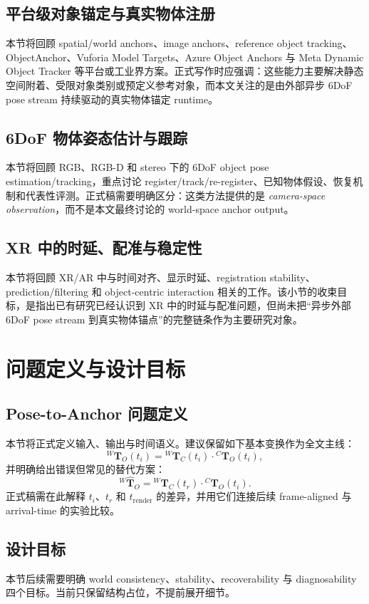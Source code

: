 \documentclass[review]{vgtc}
\begin{document}
\subsection{平台级对象锚定与真实物体注册}
本节将回顾 spatial/world anchors、image anchors、reference object tracking、ObjectAnchor、Vuforia Model Targets、Azure Object Anchors 与 Meta Dynamic Object Tracker 等平台或工业界方案。正式写作时应强调：这些能力主要解决静态空间附着、受限对象类别或预定义参考对象，而本文关注的是由外部异步 6DoF pose stream 持续驱动的真实物体锚定 runtime。

\subsection{6DoF 物体姿态估计与跟踪}
本节将回顾 RGB、RGB-D 和 stereo 下的 6DoF object pose estimation/tracking，重点讨论 register/track/re-register、已知物体假设、恢复机制和代表性评测。正式稿需要明确区分：这类方法提供的是 \textit{camera-space observation}，而不是本文最终讨论的 world-space anchor output。

\subsection{XR 中的时延、配准与稳定性}
本节将回顾 XR/AR 中与时间对齐、显示时延、registration stability、prediction/filtering 和 object-centric interaction 相关的工作。该小节的收束目标，是指出已有研究已经认识到 XR 中的时延与配准问题，但尚未把“异步外部 6DoF pose stream 到真实物体锚点”的完整链条作为主要研究对象。

\section{问题定义与设计目标}

\subsection{Pose-to-Anchor 问题定义}
本节将正式定义输入、输出与时间语义。建议保留如下基本变换作为全文主线：
\[
{}^{W}\mathbf{T}_{O}(t_i) =
{}^{W}\mathbf{T}_{C}(t_i)\cdot{}^{C}\mathbf{T}_{O}(t_i),
\]
并明确给出错误但常见的替代方案：
\[
{}^{W}\hat{\mathbf{T}}_{O} =
{}^{W}\mathbf{T}_{C}(t_r)\cdot{}^{C}\mathbf{T}_{O}(t_i).
\]
正式稿需在此解释 \(t_i\)、\(t_r\) 和 \(t_{\text{render}}\) 的差异，并用它们连接后续 frame-aligned 与 arrival-time 的实验比较。

\subsection{设计目标}
本节后续需要明确 world consistency、stability、recoverability 与 diagnosability 四个目标。当前只保留结构占位，不提前展开细节。
\end{document}
